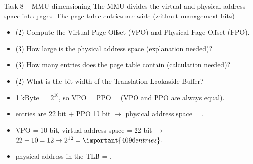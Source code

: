 \begin{example2}{Task 8 -- MMU dimensioning}
    The MMU divides the virtual and physical address space into 
    pages. The page-table entries are  wide (without management bits).
    \begin{itemize}
        \item {} (2) Compute the Virtual Page Offset (VPO) and Physical
              Page Offset (PPO).
        \item {} (3) How large is the physical address space (explanation needed)?
        \item {} (3) How many entries does the page table contain
              (calculation needed)?
        \item {} (2) What is the bit width of the Translation Lookaside Buffer?
    \end{itemize}
    \tcblower
    \begin{itemize}
        \item {} 1 kByte $= 2^{10}$, so VPO = PPO = 
              (VPO and PPO are always equal).
        \item {} entries are 22 bit + PPO 10 bit $\to$ physical address
              space = .
        \item {} VPO = 10 bit, virtual address space = 22 bit $\to$
              $22-10 = 12 \to 2^{12} = \important{4096 entries}$.
        \item {} physical address in the TLB = .
    \end{itemize}
\end{example2}

\raggedcolumns
